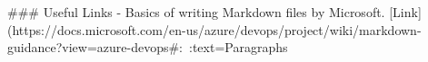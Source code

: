 ### Useful Links
- Basics of writing Markdown files by Microsoft. [Link](https://docs.microsoft.com/en-us/azure/devops/project/wiki/markdown-guidance?view=azure-devops#:~:text=Paragraphs%


